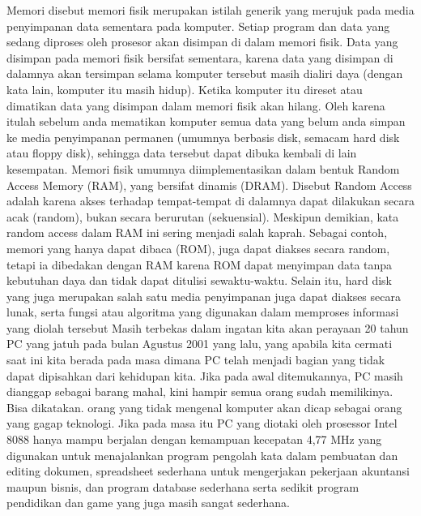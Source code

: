 
Memori disebut memori fisik merupakan istilah generik yang merujuk pada media penyimpanan data sementara pada komputer. Setiap program dan data yang sedang diproses oleh prosesor akan disimpan di dalam memori fisik. Data yang disimpan pada memori fisik bersifat sementara, karena data yang disimpan di dalamnya akan tersimpan selama komputer tersebut masih dialiri daya (dengan kata lain, komputer itu masih hidup).
Ketika komputer itu direset atau dimatikan data yang disimpan dalam memori fisik akan hilang. Oleh karena itulah sebelum anda mematikan komputer semua data yang belum anda simpan ke media penyimpanan permanen (umumnya berbasis disk, semacam hard disk atau floppy disk), sehingga data tersebut dapat dibuka kembali di lain kesempatan. Memori fisik umumnya diimplementasikan dalam bentuk Random Access Memory (RAM), yang bersifat dinamis (DRAM).
Disebut Random Access adalah karena akses terhadap tempat-tempat di dalamnya dapat dilakukan secara acak (random), bukan secara berurutan (sekuensial). Meskipun demikian, kata random access dalam RAM ini sering menjadi salah kaprah. Sebagai contoh, memori yang hanya dapat dibaca (ROM), juga dapat diakses secara random, tetapi ia dibedakan dengan RAM karena ROM dapat menyimpan data tanpa kebutuhan daya dan tidak dapat ditulisi sewaktu-waktu.
Selain itu, hard disk yang juga merupakan salah satu media penyimpanan juga dapat diakses secara lunak, serta fungsi atau algoritma yang digunakan dalam memproses informasi yang diolah tersebut Masih terbekas dalam ingatan kita akan perayaan 20 tahun PC yang jatuh pada bulan Agustus 2001 yang lalu, yang apabila kita cermati saat ini kita berada pada masa dimana PC telah menjadi bagian yang tidak dapat dipisahkan dari kehidupan kita.
Jika pada awal ditemukannya, PC masih dianggap sebagai barang mahal, kini hampir semua orang sudah memilikinya. Bisa dikatakan. orang yang tidak mengenal komputer akan dicap sebagai orang yang gagap teknologi. Jika pada masa itu PC yang diotaki oleh prosessor Intel 8088 hanya mampu berjalan dengan kemampuan kecepatan 4,77 MHz yang digunakan untuk menajalankan program pengolah kata dalam pembuatan dan editing dokumen, spreadsheet sederhana untuk mengerjakan pekerjaan akuntansi maupun bisnis, dan program database sederhana serta sedikit program pendidikan dan game yang juga masih sangat sederhana.
